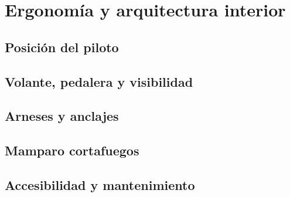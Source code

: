 \chapter{Ergonomía y arquitectura interior}
\label{ch:ergonomia_packaging}

\begin{objetivos}
  \item {}
  \item {}
  \item {}
\end{objetivos}


\section{Posición del piloto}
\label{sec:ergonomia_packaging:01}

\section{Volante, pedalera y visibilidad}
\label{sec:ergonomia_packaging:02}

\section{Arneses y anclajes}
\label{sec:ergonomia_packaging:03}

\section{Mamparo cortafuegos}
\label{sec:ergonomia_packaging:04}

\section{Accesibilidad y mantenimiento}
\label{sec:ergonomia_packaging:05}


